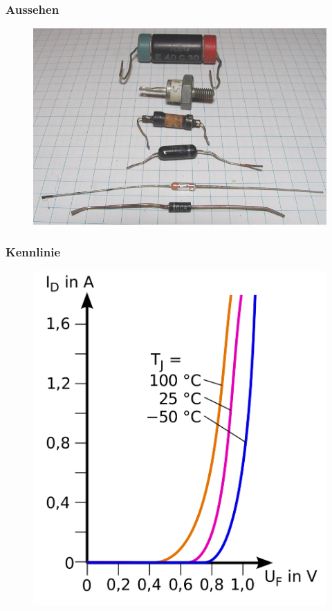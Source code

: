 \begin{frame}
    \frametitle{Aussehen}
    \begin{center}
	\begin{figure}
        \includegraphics[width=.8\textwidth,height=.8\textheight,keepaspectratio]{e12/Diodenalt2.png}
     \end{figure}
	\end{center}
\end{frame}

\begin{frame}
    \frametitle{Kennlinie}
    \begin{center}
        \begin{figure}
        \includegraphics[width=\textwidth,height=.8\textheight,keepaspectratio]{e12/Kennlinie_1N4001.png}
	\end{figure}
	\end{center}
\end{frame}

